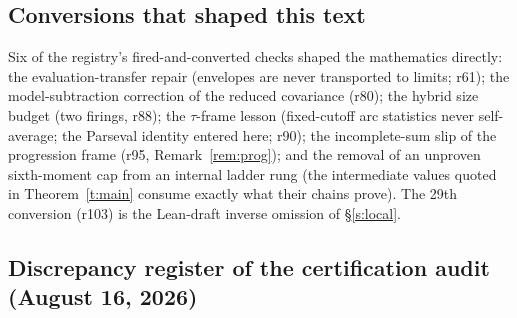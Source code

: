 \documentclass[11pt]{article}
\numberwithin{equation}{section}
\theoremstyle{definition}
\theoremstyle{remark}
\begin{document}
\subsection*{Conversions that shaped this text}

Six of the registry's fired-and-converted checks shaped the
mathematics directly: the evaluation-transfer repair (envelopes
are never transported to limits; r61); the model-subtraction
correction of the reduced covariance (r80); the hybrid size
budget (two firings, r88); the $\tau$-frame lesson (fixed-cutoff
arc statistics never self-average; the Parseval identity entered
here; r90); the incomplete-sum slip of the progression frame
(r95, Remark~\ref{rem:prog}); and the removal of an unproven
sixth-moment cap from an internal ladder rung (the intermediate
values quoted in Theorem~\ref{t:main} consume exactly what their
chains prove). The 29th conversion (r103) is the Lean-draft
inverse omission of \S\ref{s:local}.

\subsection*{Discrepancy register of the certification audit
(August 16, 2026)}
\end{document}
